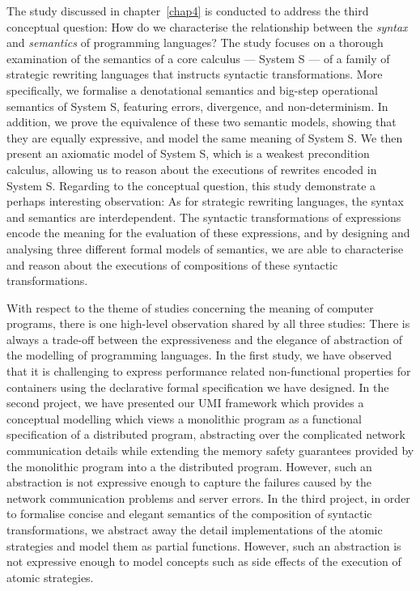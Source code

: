 The study discussed in chapter~\ref{chap4} is conducted to address the third conceptual question: How do we characterise the relationship between the \emph{syntax} and \emph{semantics} of programming languages? The study focuses on a thorough examination of the semantics of a core calculus --- System S --- of a family of strategic rewriting languages that instructs syntactic transformations. More specifically, we formalise a denotational semantics and big-step operational semantics of System S, featuring errors, divergence, and non-determinism. In addition, we prove the equivalence of these two semantic models, showing that they are equally expressive, and model the same meaning of System S. We then present an axiomatic model of System S, which is a weakest precondition calculus, allowing us to reason about the executions of rewrites encoded in System S. Regarding to the conceptual question, this study demonstrate a perhaps interesting observation: As for strategic rewriting languages, the syntax and semantics are interdependent. The syntactic transformations of expressions encode the meaning for the evaluation of these expressions, and by designing and analysing three different formal models of semantics, we are able to characterise and reason about the executions of compositions of these syntactic transformations.

With respect to the theme of studies concerning the meaning of computer programs, there is one high-level observation shared by all three studies: There is always a trade-off between the expressiveness and the elegance of abstraction of the modelling of programming languages. In the first study, we have observed that it is challenging to express performance related non-functional properties for containers using the declarative formal specification we have designed. In the second project, we have presented our UMI framework which provides a conceptual modelling which views a monolithic program as a functional specification of a distributed program, abstracting over the complicated network communication details while extending the memory safety guarantees provided by the monolithic program into a the distributed program. However, such an abstraction is not expressive enough to capture the failures caused by the network communication problems and server errors. In the third project, in order to formalise concise and elegant semantics of the composition of syntactic transformations, we abstract away the detail implementations of the atomic strategies and model them as partial functions. However, such an abstraction is not expressive enough to model concepts such as side effects of the execution of atomic strategies.

